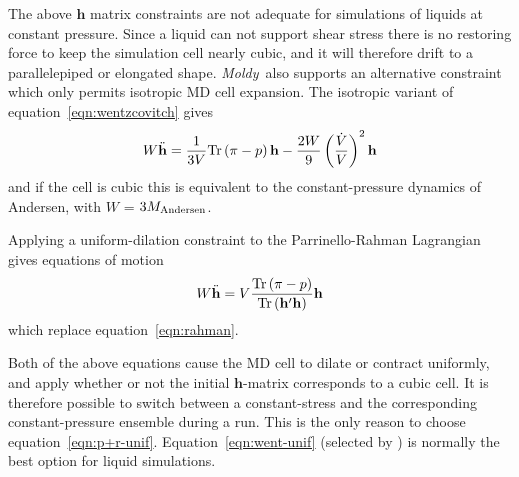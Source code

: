 \documentclass[a4paper,twoside]{report}
\providecommand{\bm}[1]{\mathbf{#1}}
\newcommand{\moldy}{\emph{Moldy}}
\begin{document}
The above $\bm{h}$ matrix constraints are not adequate for
simulations of liquids at constant pressure.  Since a liquid can not
support shear stress there is no restoring force to keep the
simulation cell nearly cubic, and it will therefore drift to a
parallelepiped or elongated shape.  \moldy\ also supports an
alternative constraint which only permits isotropic MD cell
expansion.  The isotropic variant of
equation~\ref{eqn:wentzcovitch} gives 
\begin{equation}
  \label{eqn:went-unif}
    W\ddot{\bm{h}} = \frac{1}{3 V}\textnormal{Tr}\left ( \bm{\pi} - p \right ) \bm{h} 
    -\frac{2 W}{9} \left ( \frac{\dot{V}}{V}\right )^2 \bm{h}
\end{equation}
and if the cell is cubic this is equivalent to the 
constant-pressure dynamics of Andersen\cite{andersen:80}, with
$W$ = $3 M_\textnormal{Andersen}$.

Applying a uniform-dilation constraint to the Parrinello-Rahman
Lagrangian gives equations of motion
\begin{equation}
  \label{eqn:p+r-unif}
  W\ddot{\bm{h}} = V \frac{\textnormal{Tr}\left ( \bm{\pi} - p \right)}{
    \textnormal{Tr}\left (  \bm{h'} \bm{h} \right )}\bm{h}
\end{equation}
which replace equation~\ref{eqn:rahman}.

Both of the above equations cause the MD cell to dilate or contract
uniformly, and apply whether or not the initial $\bm{h}$-matrix
corresponds to a cubic cell.  It is therefore possible to switch
between a constant-stress and the corresponding constant-pressure
ensemble during a run.  This is the only reason to choose
equation~\ref{eqn:p+r-unif}.  
Equation~\ref{eqn:went-unif} (selected by ) is
normally  the best option for liquid simulations.


\end{document}

